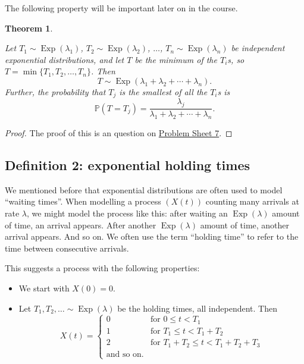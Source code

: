 \documentclass[
  a4paper,
]{article}
\providecommand{\tightlist}{%
  \setlength{\itemsep}{0pt}\setlength{\parskip}{0pt}}
\newtheorem{theorem}{Theorem}[section]
\theoremstyle{definition}
\theoremstyle{definition}
\theoremstyle{definition}
\theoremstyle{remark}
\begin{document}
The following property will be important later on in the course.

\begin{theorem}
\protect\hypertarget{thm:exponential-thm}{}\label{thm:exponential-thm}

Let \(T_1 \sim \operatorname{Exp}(\lambda_1)\), \(T_2 \sim \operatorname{Exp}(\lambda_2)\), \(\dots\), \(T_n \sim \operatorname{Exp}(\lambda_n)\) be independent exponential distributions, and let \(T\) be the minimum of the \(T_i\)s, so \(T = \min\{T_1, T_2, \dots, T_n \}\). Then
\[ T \sim \operatorname{Exp}(\lambda_1 + \lambda_2 + \cdots + \lambda_n) . \]
Further, the probability that \(T_j\) is the smallest of all the \(T_i\)s is
\[ \mathbb P(T = T_j) = \frac{\lambda_j}{\lambda_1 + \lambda_2 + \cdots + \lambda_n} . \]

\end{theorem}

\begin{proof}

The proof of this is an question on \protect\hyperlink{P07}{Problem Sheet 7}.

\end{proof}

\hypertarget{definition-2-exponential-holding-times}{%
\subsection{Definition 2: exponential holding times}\label{definition-2-exponential-holding-times}}

We mentioned before that exponential distributions are often used to model ``waiting times''.
When modelling a process \((X(t))\) counting many arrivals at rate \(\lambda\), we might model the process like this: after waiting an \(\operatorname{Exp}(\lambda)\) amount of time, an arrival appears. After another \(\operatorname{Exp}(\lambda)\) amount of time, another arrival appears. And so on. We often use the term ``holding time'' to refer to the time between consecutive arrivals.

This suggests a process with the following properties:

\begin{itemize}
\tightlist
\item
  We start with \(X(0) = 0\).
\item
  Let \(T_1, T_2, \dots \sim \operatorname{Exp}(\lambda)\) be the holding times, all independent. Then
  \[ X(t) = \begin{cases} 0 & \text{for $0 \leq t < T_1$} \\
    1 & \text{for $T_1 \leq t < T_1 + T_2$} \\
    2 & \text{for $T_1+T_2 \leq t < T_1 + T_2 + T_3$} \\
    \text{and so on.} & \end{cases} \]
\end{itemize}
\end{document}
